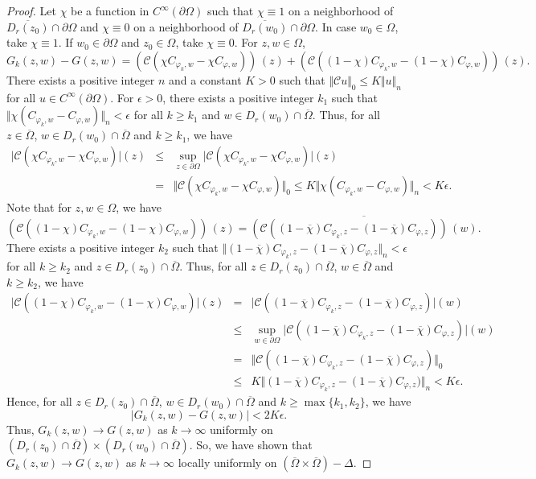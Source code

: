 \documentclass[11pt, reqno]{amsart}
\numberwithin{equation}{section}
\begin{document}
\begin{proof}
Let $\chi$ be a function in $C^{\infty}(\partial\Omega)$ such that $\chi\equiv 1$ on a neighborhood of $\overline{D_r(z_0)}\cap \partial\Omega$ and $\chi\equiv 0$ on a neighborhood of $\overline{D_r(w_0)}\cap \partial\Omega$. In case $w_0\in\Omega$, take $\chi\equiv 1$. If $w_0\in\partial\Omega$ and $z_0\in\Omega$, take $\chi\equiv 0$. For $z,w\in\Omega$,
\[
G_k(z,w)-G(z,w)=(\mathcal{C}(\chi C_{\varphi_k,w} - \chi C_{\varphi,w}))\,(z) + (\mathcal{C}((1-\chi)C_{\varphi_k,w} - (1-\chi)C_{\varphi,w}))\,(z).
\]
There exists a positive integer $n$ and a constant $K>0$ such that $\Vert \mathcal{C}u\Vert_0\leq K \Vert u\Vert_{n}$ for all $u\in C^{\infty}(\partial\Omega)$.
For $\epsilon>0$, there exists a positive integer $k_1$ such that $\Vert \chi(C_{\varphi_k,w} - C_{\varphi,w})\Vert_n<\epsilon$ for all  $k\geq k_1$ and $w\in D_r(w_0)\cap \overline{\Omega}$. Thus, for all $z\in \overline{\Omega}$, $w\in D_r(w_0)\cap \overline{\Omega}$ and $k\geq k_1$, we have
\begin{eqnarray*}
\vert \mathcal{C}(\chi C_{\varphi_k,w} - \chi C_{\varphi,w})\vert(z) 
&\leq&
\sup_{z\in\partial\Omega}\vert \mathcal{C}(\chi C_{\varphi_k,w} - \chi C_{\varphi,w})\vert(z)\\
&=&
\Vert \mathcal{C}(\chi C_{\varphi_k,w} - \chi C_{\varphi,w})\Vert_0
\leq
K \Vert \chi(C_{\varphi_k,w} - C_{\varphi,w})\Vert_n<K\epsilon.
\end{eqnarray*}
Note that for $z,w\in\Omega$, we have 
\[
(\mathcal{C}((1-\chi)C_{\varphi_k,w} - (1-\chi)C_{\varphi,w}))\,(z)
=
\overline{(\mathcal{C}((1-\overline{\chi})C_{\varphi_k,z} - (1-\overline{\chi})C_{\varphi,z}))\,(w)}.
\]
There exists a positive integer $k_2$ such that $\Vert (1-\overline{\chi})C_{\varphi_k,z} - (1-\overline{\chi})C_{\varphi,z}\Vert_n<\epsilon$ for all $k\geq k_2$ and $z\in D_r(z_0)\cap\overline{\Omega}$. Thus, for all $z\in D_r(z_0)\cap\overline{\Omega}$, $w\in \overline{\Omega}$ and $k\geq k_2$, we have
\begin{eqnarray*}
\vert \mathcal{C}((1-\chi) C_{\varphi_k,w} - (1-\chi) C_{\varphi,w})\vert(z) &=&
\vert \mathcal{C}((1-\overline{\chi}) C_{\varphi_k,z} - (1-\overline{\chi}) C_{\varphi,z})\vert(w)\\
&\leq&
\sup_{w\in\partial\Omega}\vert \mathcal{C}((1-\overline{\chi}) C_{\varphi_k,z} - (1-\overline{\chi}) C_{\varphi,z})\vert(w)\\
&=&
\Vert \mathcal{C}((1-\overline{\chi}) C_{\varphi_k,z} - (1-\overline{\chi}) C_{\varphi,z})\Vert_0\\
&\leq&
K \Vert (1-\overline{\chi})C_{\varphi_k,z} - (1-\overline{\chi})C_{\varphi,z})\Vert_n<K\epsilon.
\end{eqnarray*}
Hence, for all $z\in D_r(z_0)\cap\overline{\Omega}$, $w\in D_r(w_0)\cap\overline{\Omega}$ and $k\geq \max\{k_1,k_2\}$, we have
\[
\vert G_k(z,w)-G(z,w)\vert <2K\epsilon.
\]
Thus, $G_k(z,w)\rightarrow G(z,w)$ as $k\rightarrow\infty$ uniformly on $(D_r(z_0)\cap\overline{\Omega})\times (D_r(w_0)\cap\overline{\Omega})$. So, we have shown that $G_k(z,w)\rightarrow G(z,w)$ as $k\rightarrow\infty$ locally uniformly on $(\overline{\Omega}\times\overline{\Omega})-\Delta$.


\end{proof}
\end{document}
